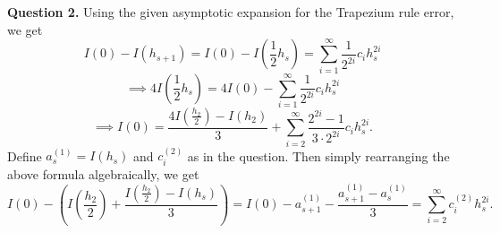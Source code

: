 \documentclass[letterpaper, reqno,11pt]{article}
\begin{document}
{\medskip\noindent\bf Question 2.} Using the given asymptotic expansion for the Trapezium rule error, we get
\[
I(0)-I(h_{s+1})=I(0)-I(\frac{1}{2}h_s)=\sum_{i=1}^{\infty}\frac{1}{2^{2i}}c_ih_s^{2i}
\]
\[
\implies 4I(\frac{1}{2}h_s)=4I(0)-\sum_{i=1}^{\infty}\frac{1}{2^{2i}}c_ih_s^{2i}
\]
\[
\implies I(0)=\frac{4I(\frac{h_2}{2})-I(h_2)}{3}+ \sum_{i=2}^{\infty}\frac{2^{2i}-1}{3\cdot 2^{2i}}c_i h_s^{2i}
.\]
Define $a_s^{(1)}=I(h_s)$ and $c_i^{(2)}$ as in the question. Then simply rearranging the above formula algebraically, we get
\[
I(0)-\left(I(\frac{h_2}{2})+\frac{I(\frac{h_2}{2})-I(h_s)}{3}\right)=I(0)-a_{s+1}^{(1)}-\frac{a_{s+1}^{(1)}-a_s^{(1)}}{3}=\sum_{i=2}^{\infty}c_{i}^{(2)}h_s^{2i}
.\]
\end{document}

